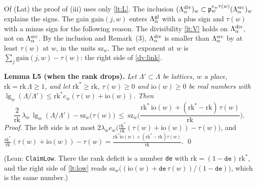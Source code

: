 \documentclass[11pt,letterpaper]{article}
\begin{document}
\noindent Of \textup{(Lat)} the proof of (iii) uses only \eqref{lt:L}. The inclusion
$(\Lambda^{\rm div}_\alpha)_w\subset\mathfrak p_w^{e_w\tau(w)}(\Lambda^{\rm src}_\alpha)_w$ explains the
signs. The gain $\mathrm{gain}(j,w)$ enters $\Lambda^{\rm gl}_\alpha$ with a plus sign and $\tau(w)$ with a
minus sign for the following reason. The divisibility \eqref{lt:V} holds on $\Lambda^{\rm div}_\alpha$, not
on $\Lambda^{\rm src}_\alpha$. By the inclusion and Remark~(3), $\Lambda^{\rm div}_\alpha$ is smaller than
$\Lambda^{\rm src}_\alpha$ by at least $\tau(w)$ at $w$, in the units $\mathrm{sz}_w$. The net exponent at
$w$ is $\sum_j\mathrm{gain}(j,w)-\tau(w)$: the right side of \eqref{dv:link}.

\textbf{Lemma L5 (when the rank drops).} \emph{Let $\Lambda'\subset\Lambda$ be lattices, $w$ a place,
$\mathrm{rk}=\mathrm{rk}\,\Lambda\ge1$, and let $\mathrm{rk}^*\ge\mathrm{rk}$, $\tau(w)\ge0$ and
$\mathrm{io}(w)\ge0$ be real numbers with
$\lg_w(\Lambda/\Lambda')\le\mathrm{rk}^*e_w(\tau(w)+\mathrm{io}(w))$. Then}
\begin{equation}\label{lt:low}
 \frac2{\mathrm{rk}}\,\lambda_w\,\lg_w(\Lambda/\Lambda')-\mathrm{sz}_w\big(\tau(w)\big)\ \le\
 \mathrm{sz}_w\Big(\frac{\mathrm{rk}^*\,\mathrm{io}(w)+(\mathrm{rk}^*-\mathrm{rk})\,\tau(w)}{\mathrm{rk}}\Big).
\end{equation}
\emph{Proof.} The left side is at most
$2\lambda_we_w\big(\frac{\mathrm{rk}^*}{\mathrm{rk}}(\tau(w)+\mathrm{io}(w))-\tau(w)\big)$, and
$\frac{\mathrm{rk}^*}{\mathrm{rk}}(\tau(w)+\mathrm{io}(w))-\tau(w)=
\frac{\mathrm{rk}^*\mathrm{io}(w)+(\mathrm{rk}^*-\mathrm{rk})\tau(w)}{\mathrm{rk}}$. \qed

\noindent (Lean: \texttt{ClaimLow}. There the rank deficit is a number \texttt{de} with
$\mathrm{rk}=(1-\mathtt{de})\,\mathrm{rk}^*$, and the right side of \eqref{lt:low} reads
$\mathrm{sz}_w\big((\mathrm{io}(w)+\mathtt{de}\,\tau(w))/(1-\mathtt{de})\big)$, which is the same number.)
\end{document}
